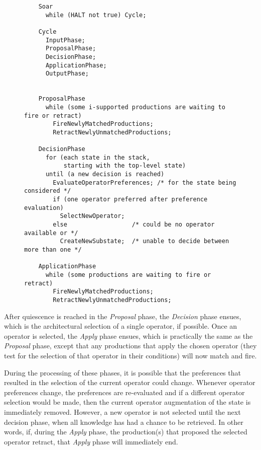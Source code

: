 \begin{figure}
	\label{fig:decisioncycle}
\end{figure}

\begin{figure}
	\begin{verbatim}
	Soar
	  while (HALT not true) Cycle;
	  
	Cycle
	  InputPhase;
	  ProposalPhase;
	  DecisionPhase;
	  ApplicationPhase;
	  OutputPhase;
	
	
	ProposalPhase
	  while (some i-supported productions are waiting to fire or retract)
	    FireNewlyMatchedProductions;
	    RetractNewlyUnmatchedProductions;
	
	DecisionPhase
	  for (each state in the stack, 
	       starting with the top-level state)
	  until (a new decision is reached)
	    EvaluateOperatorPreferences; /* for the state being considered */
	    if (one operator preferred after preference evaluation)
	      SelectNewOperator;
	    else                  /* could be no operator available or */
	      CreateNewSubstate;  /* unable to decide between more than one */
	
	ApplicationPhase
	  while (some productions are waiting to fire or retract)
	    FireNewlyMatchedProductions;
	    RetractNewlyUnmatchedProductions;
	\end{verbatim}
	
	\label{fig:pseudocode}
\end{figure}

After quiescence is reached in the \emph{Proposal} phase, the \emph{Decision} phase ensues, which is the architectural selection of a single operator, if possible. Once an operator is selected, the \emph{Apply} phase ensues, which is practically the same as the \emph{Proposal} phase, except that any productions that apply the chosen operator (they test for the selection of that operator in their conditions) will now match and fire.

During the processing of these phases, it is possible that the preferences that resulted in the selection of the current operator could change.  Whenever operator preferences change, the preferences are re-evaluated and if a different operator selection would be made, then the current operator augmentation of the state is immediately removed. However, a new operator is not selected until the next decision phase, when all knowledge has had a chance to be retrieved. In other words, if, during the \emph{Apply} phase, the production(s) that proposed the selected operator retract, that \emph{Apply} phase will immediately end.


